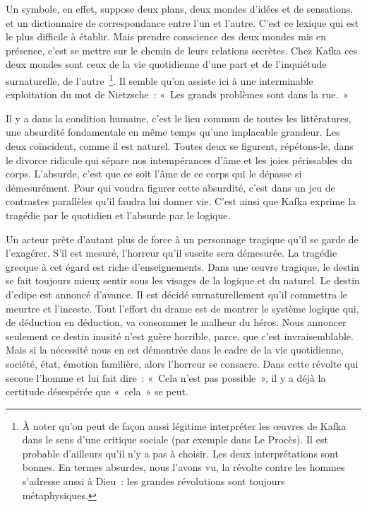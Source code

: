 \documentclass{book}
\begin{document}
Un symbole, en effet, suppose deux plans, deux mondes d'idées et de sensations, et un dictionnaire de correspondance entre l'un et l'autre. C'est ce lexique qui est le plus difficile à établir. Mais prendre conscience des deux mondes mis en présence, c'est se mettre sur le chemin de leurs relations secrètes. Chez Kafka ces deux mondes sont ceux de la vie quotidienne d'une part et de l'inquiétude surnaturelle, de l'autre \footnote{À noter qu'on peut de façon aussi légitime interpréter les œuvres de Kafka dans le sens d'une critique sociale (par exemple dans Le Procès). Il est probable d'ailleurs qu'il n'y a pas à choisir. Les deux interprétations sont bonnes. En termes absurdes, nous l'avons vu, la révolte contre les hommes s'adresse aussi à Dieu : les grandes révolutions sont toujours métaphysiques.}. Il semble qu'on assiste ici à une interminable exploitation du mot de Nietzsche : « Les grands problèmes sont dans la rue. »

Il y a dans la condition humaine, c'est le lieu commun de toutes les littératures, une absurdité fondamentale en même temps qu'une implacable grandeur. Les deux coïncident, comme il est naturel. Toutes deux se figurent, répétons-le, dans le divorce ridicule qui sépare nos intempérances d'âme et les joies périssables du corps. L'absurde, c'est que ce soit l'âme de ce corps qui le dépasse si démesurément. Pour qui voudra figurer cette absurdité, c'est dans un jeu de contrastes parallèles qu'il faudra lui donner vie. C'est ainsi que Kafka exprime la tragédie par le quotidien et l'absurde par le logique.

Un acteur prête d'autant plus de force à un personnage tragique qu'il se garde de l'exagérer. S'il est mesuré, l'horreur qu'il suscite sera démesurée. La tragédie grecque à cet égard est riche d'enseignements. Dans une œuvre tragique, le destin se fait toujours mieux sentir sous les visages de la logique et du naturel. Le destin d'edipe est annoncé d'avance. Il est décidé surnaturellement qu'il commettra le meurtre et l'inceste. Tout l'effort du drame est de montrer le système logique qui, de déduction en déduction, va consommer le malheur du héros. Nous annoncer seulement ce destin inusité n'est guère horrible, parce, que c'est invraisemblable. Mais si la nécessité nous en est démontrée dans le cadre de la vie quotidienne, société, état, émotion familière, alors l'horreur se consacre. Dans cette révolte qui secoue l'homme et lui fait dire : « Cela n'est pas possible », il y a déjà la certitude désespérée que « cela » se peut.
\end{document}
